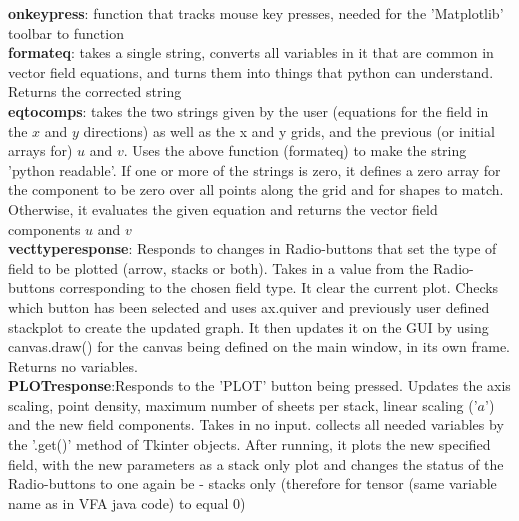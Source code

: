 \documentclass[11]{report}
\begin{document}
\textbf{on\textunderscore key\textunderscore press}: function that tracks mouse key presses, needed for the 'Matplotlib' toolbar to function\\
\textbf{format\textunderscore eq}: takes a single string, converts all variables in it that are common in vector field equations, and turns them into things that python can understand. Returns the corrected string\\
\textbf{eq\textunderscore to\textunderscore comps}: takes the two strings given by the user (equations for the field in the $x$ and $y$ directions) as well as the x and y grids, and the previous (or initial arrays for) $u$ and $v$. Uses the above function (format\textunderscore eq) to make the string 'python readable'. If one or more of the strings is zero, it defines a zero array for the component to be zero over all points along the grid and for shapes to match. Otherwise, it evaluates the given equation and returns the vector field components $u$ and $v$\\
\textbf{vect\textunderscore type\textunderscore response}: Responds to changes in Radio-buttons that set the type of field to be plotted (arrow, stacks or both). Takes in a value from the Radio-buttons corresponding to the chosen field type. It clear the current plot. Checks which button has been selected and uses ax.quiver and previously user defined stack\textunderscore plot to create the updated graph. It then updates it on the GUI by using canvas.draw() for the canvas being defined on the main window, in its own frame. Returns no variables.\\
\textbf{PLOT\textunderscore response}:Responds to the 'PLOT' button being pressed. Updates the axis scaling, point density, maximum number of sheets per stack, linear scaling ('$a$') and the new field components. Takes in no input. collects all needed variables by the '.get()' method of Tkinter objects. After running, it plots the new specified field, with the new parameters as a stack only plot and changes the status of the Radio-buttons to one again be - stacks only (therefore for tensor (same variable name as in VFA java code) to equal 0)
\end{document}
